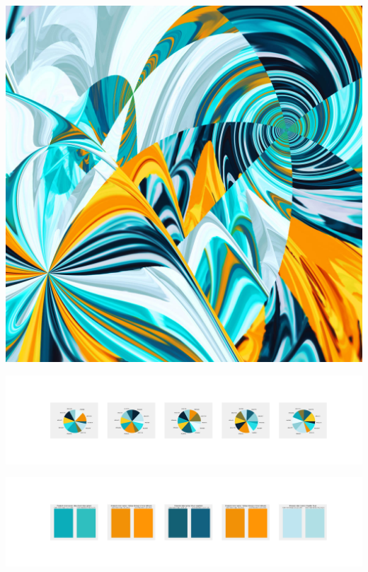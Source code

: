 \documentclass[11pt]{article}
\begin{document}
\begin{landscape}
    \begin{center}
    \includegraphics[width=\textwidth]{./nbimg/file (441).jpg}
    \end{center}

    \begin{center}
    \includegraphics[width=250mm]{./nbimg/pie-380.jpg}
    \end{center}

    \begin{center}
    \includegraphics[width=250mm]{./nbimg/peak-380.jpg}
    \end{center}
    


\end{landscape}
\end{document}
